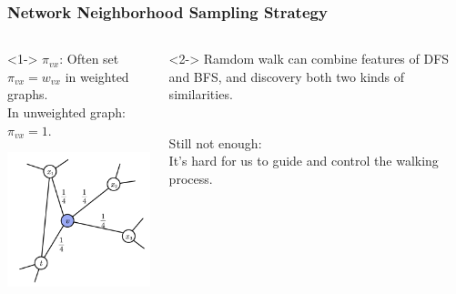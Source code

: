 \documentclass[notes, 10pt, aspectratio=169]{beamer}
\begin{document}
\begin{frame}
    \frametitle{Network Neighborhood Sampling Strategy}
    \begin{columns}
        \begin{column}{0.5\textwidth}<1->
            $\pi_{vx}$: Often set $\pi_{vx}=w_{vx}$ in weighted graphs.\\
            In unweighted graph: $\pi_{vx}=1$.
            \begin{center}
                \includegraphics[width=5cm]{./graphics/Randomwalk.png}
            \end{center}
        \end{column}
        \begin{column}{0.5\textwidth}<2->
            Ramdom walk can combine features of DFS and BFS, and discovery both two kinds of similarities.\par ~\\
            Still not enough:\\
            It’s hard for us to guide and control the walking process.
        \end{column}
    \end{columns}
\end{frame}
\end{document}
